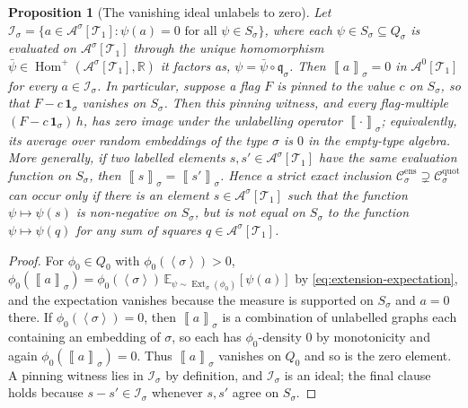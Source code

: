 \documentclass[11pt]{article}
\newtheorem{proposition}[proposition]{Proposition}
\theoremstyle{definition}
\newcommand{\R}{\mathbb{R}}
\newcommand{\E}{\mathbb{E}}
\newcommand{\A}{\mathcal{A}}
\newcommand{\T}{\mathcal{T}}
\newcommand{\C}{\mathcal{C}}
\newcommand{\Homp}{\operatorname{Hom}^{+}}
\newcommand{\Ext}{\operatorname{Ext}}
\newcommand{\brak}[1]{\left\langle #1\right\rangle}
\newcommand{\avg}[2]{\left\llbracket #1 \right\rrbracket_{#2}}
\newcommand{\qmap}{\mathfrak q}
\newcommand{\one}{\mathbf 1}
\begin{document}
\begin{proposition}[The vanishing ideal unlabels to zero]\label{prop:ideal-zero}
Let $\mathcal I_\sigma=\{a\in\A^\sigma[\T_1]:\psi(a)=0\text{ for all }\psi\in S_\sigma\}$,
where each $\psi\in S_\sigma\subseteq Q_\sigma$ is evaluated on $\A^\sigma[\T_1]$ through
the unique homomorphism $\bar\psi\in\Homp(\A^\sigma[\T_1],\R)$ it factors as,
$\psi=\bar\psi\circ\qmap_\sigma$.
Then $\avg{a}{\sigma}=0$ in $\A^0[\T_1]$ for every $a\in\mathcal I_\sigma$.  In
particular, suppose a flag $F$ is pinned to the value $c$ on $S_\sigma$, so that
$F-c\,\one_\sigma$ vanishes on $S_\sigma$.  Then this pinning witness, and every
flag-multiple $(F-c\,\one_\sigma)\,h$, has zero image under the unlabelling operator
$\avg{\cdot}{\sigma}$; equivalently, its average over random embeddings of the type
$\sigma$ is $0$ in the empty-type algebra.  More generally, if
two labelled elements $s,s'\in\A^\sigma[\T_1]$ have the same evaluation function on
$S_\sigma$,
then $\avg{s}{\sigma}=\avg{s'}{\sigma}$.  Hence a strict exact inclusion
$\C^{\mathrm{ens}}_\sigma\supsetneq\C^{\mathrm{quot}}_\sigma$ can occur only if there is
an element $s\in\A^\sigma[\T_1]$ such that the function
$\psi\mapsto\psi(s)$ is non-negative on $S_\sigma$, but is not equal on
$S_\sigma$ to the function $\psi\mapsto\psi(q)$ for any sum of squares
$q\in\A^\sigma[\T_1]$.
\end{proposition}

\begin{proof}
For $\phi_0\in Q_0$ with $\phi_0(\brak\sigma)>0$,
$\phi_0(\avg{a}{\sigma})=\phi_0(\brak\sigma)\,\E_{\psi\sim\Ext_\sigma(\phi_0)}[\psi(a)]$
by \eqref{eq:extension-expectation}, and the expectation vanishes because the measure is
supported on $S_\sigma$ and $a=0$ there.  If $\phi_0(\brak\sigma)=0$, then
$\avg{a}{\sigma}$ is a combination of unlabelled graphs each containing an embedding of
$\sigma$, so each has $\phi_0$-density $0$ by monotonicity and again
$\phi_0(\avg{a}{\sigma})=0$.  Thus $\avg{a}{\sigma}$ vanishes on $Q_0$ and so is the zero
element.  A pinning witness lies in $\mathcal I_\sigma$ by definition, and
$\mathcal I_\sigma$ is an ideal; the final clause holds because
$s-s'\in\mathcal I_\sigma$ whenever $s,s'$ agree on $S_\sigma$.
\end{proof}
\end{document}
